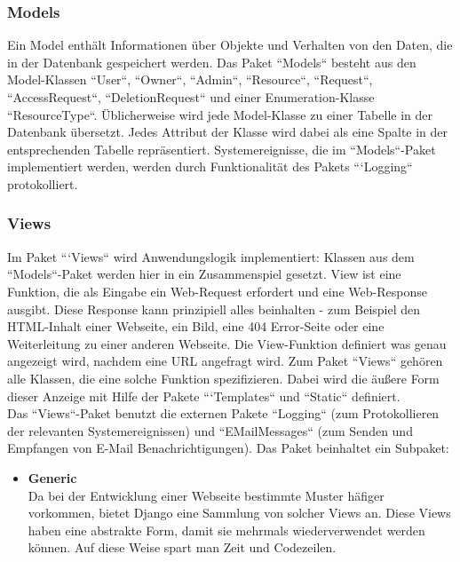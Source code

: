 \documentclass[parskip=full,11pt]{scrartcl}
\begin{document}
 \subsubsection*{Models}
Ein Model enthält Informationen über Objekte und Verhalten von den Daten, die in der Datenbank gespeichert werden.
Das Paket ``Models`` besteht aus den Model-Klassen ``User``, ``Owner``, ``Admin``, ``Resource``, ``Request``, ``AccessRequest``, ``DeletionRequest`` und einer Enumeration-Klasse ``ResourceType``. Üblicherweise wird jede Model-Klasse zu einer Tabelle in der Datenbank übersetzt. Jedes Attribut der Klasse wird dabei als eine Spalte in der entsprechenden Tabelle repräsentiert. Systemereignisse, die im ``Models``-Paket implementiert werden, werden durch Funktionalität des Pakets ```Logging`` protokolliert.  

 \subsubsection*{Views}
Im Paket ```Views`` wird Anwendungslogik implementiert: Klassen aus dem ``Models``-Paket werden hier in ein Zusammenspiel gesetzt. View ist eine Funktion, die als Eingabe ein Web-Request erfordert und eine Web-Response ausgibt. Diese Response kann prinzipiell alles beinhalten - zum Beispiel den HTML-Inhalt einer Webseite, ein Bild, eine 404 Error-Seite oder eine Weiterleitung zu einer anderen Webseite. Die View-Funktion definiert was genau angezeigt wird, nachdem eine URL angefragt wird. Zum Paket ``Views`` gehören alle Klassen, die eine solche Funktion spezifizieren. Dabei wird die äußere Form dieser Anzeige mit Hilfe der Pakete ```Templates`` und ``Static`` definiert.\\
Das ``Views``-Paket benutzt die externen Pakete ``Logging`` (zum Protokollieren der relevanten Systemereignissen) und ``EMailMessages`` (zum Senden und Empfangen von E-Mail Benachrichtigungen).
Das Paket beinhaltet ein Subpaket:

\begin{itemize}
\item{\textbf{Generic}}\\
Da bei der Entwicklung einer Webseite bestimmte Muster häfiger vorkommen, bietet Django eine Sammlung von solcher Views an. Diese Views haben eine abstrakte Form, damit sie mehrmals wiederverwendet werden können. Auf diese Weise spart man Zeit und Codezeilen.
\end{itemize}
 
\end{document}
